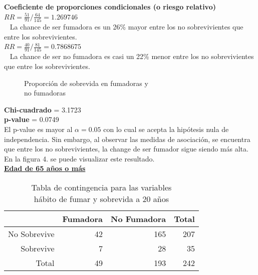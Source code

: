 \documentclass[12pt,letterpaper,fleqn]{article}
\begin{document}
\begin{enumerate}[label=\textbf{\arabic*.}]
\begin{enumerate}[label=\textbf{\alph*.}]
                \textbf{Coeficiente de proporciones condicionales (o riesgo relativo)}\\
                 $ RR =  \frac{51}{91}/\frac{64}{145} = 1.269746 $ \\ 
                 La chance de ser fumadora es un 26\% mayor entre los no sobrevivientes que entre los sobrevivientes.\\
                 $ RR =  \frac{40}{91}/\frac{81}{145} = 0.7868675 $ \\ 
                 La chance de ser no fumadora es casi un 22\% menor entre los no sobrevivientes que entre los sobrevivientes.\\

                \begin{figure}[!htb]
                    \centering
                    
                    \caption{Proporción de sobrevida en fumadoras y \\no fumadoras}
                    \label{fig:figure1}
                \end{figure}
                \FloatBarrier
                \textbf{Chi-cuadrado} = 3.1723 \\
                \textbf{p-value} = 0.0749 \\
                El p-value es mayor al $ \alpha = 0.05 $ con lo cual se acepta la hipótesis nula de independencia. Sin embargo, al observar las medidas de asociación, se encuentra que entre los no sobrevivientes, la change de ser fumador sigue siendo más alta. En la figura 4. se puede visualizar este resultado.\\

                \underline{\textbf{Edad de 65 años o más}}
                \begin{table}[ht]
                    \centering
                    \caption{Tabla de contingencia para las variables \\ hábito de fumar y sobrevida a 20 años}
                    \begin{tabular}{rrrr}
                      \hline
                     & Fumadora & No Fumadora \vline& Total \\
                      \hline
                    No Sobrevive & 42 & 165 \vline& 207 \\
                      Sobrevive & 7 & 28 \vline & 35 \\
                      \hline
                      Total & 49 & 193 \vline & 242 \\
                       \hline
                    \end{tabular}
                \end{table}


\end{enumerate}
\end{enumerate}
\end{document}
